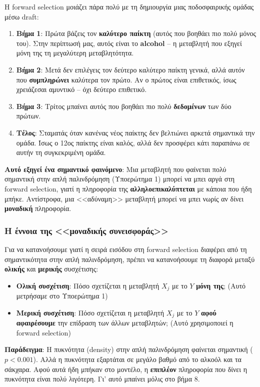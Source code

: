 \documentclass[12pt,a4paper]{article}
\begin{document}
\begin{examplebox}
Η forward selection μοιάζει πάρα πολύ με τη δημιουργία μιας ποδοσφαιρικής ομάδας μέσω draft:
\begin{enumerate}
    \item \textbf{Βήμα 1}: Πρώτα βάζεις τον \textbf{καλύτερο παίκτη} (αυτός που βοηθάει πιο πολύ μόνος του). Στην περίπτωσή μας, αυτός είναι το \textbf{alcohol} -- η μεταβλητή που εξηγεί μόνη της τη μεγαλύτερη μεταβλητότητα.
    \item \textbf{Βήμα 2}: Μετά δεν επιλέγεις τον δεύτερο καλύτερο παίκτη γενικά, αλλά αυτόν που \textbf{συμπληρώνει} καλύτερα τον πρώτο. Αν ο πρώτος είναι επιθετικός, ίσως χρειάζεσαι αμυντικό -- όχι δεύτερο επιθετικό.
    \item \textbf{Βήμα 3}: Τρίτος μπαίνει αυτός που βοηθάει πιο πολύ \textbf{δεδομένων} των δύο πρώτων.
    \item \textbf{Τέλος}: Σταματάς όταν κανένας νέος παίκτης δεν βελτιώνει αρκετά σημαντικά την ομάδα. Ίσως ο 12ος παίκτης είναι καλός, αλλά δεν προσφέρει κάτι παραπάνω σε αυτήν τη συγκεκριμένη ομάδα.
\end{enumerate}

\textbf{Αυτό εξηγεί ένα σημαντικό φαινόμενο}: Μια μεταβλητή που φαίνεται πολύ σημαντική στην απλή παλινδρόμηση (Υποερώτημα 1) μπορεί να μπει αργά στη forward selection, γιατί η πληροφορία της \textbf{αλληλοεπικαλύπτεται} με κάποια που ήδη μπήκε. Αντίστροφα, μια <<αδύναμη>> μεταβλητή μπορεί να μπει νωρίς αν δίνει \textbf{μοναδική} πληροφορία.
\end{examplebox}

\subsubsection{Η έννοια της <<μοναδικής συνεισφοράς>>}

\begin{theorybox}
Για να κατανοήσουμε γιατί η σειρά εισόδου στη forward selection διαφέρει από τη σημαντικότητα στην απλή παλινδρόμηση, πρέπει να κατανοήσουμε τη διαφορά μεταξύ \textbf{ολικής} και \textbf{μερικής} συσχέτισης:

\begin{itemize}
    \item \textbf{Ολική συσχέτιση}: Πόσο σχετίζεται η μεταβλητή $X_j$ με το $Y$ \textbf{μόνη της}; (Αυτό μετρήσαμε στο Υποερώτημα 1)
    \item \textbf{Μερική συσχέτιση}: Πόσο σχετίζεται η μεταβλητή $X_j$ με το $Y$ \textbf{αφού αφαιρέσουμε} την επίδραση των άλλων μεταβλητών; (Αυτό χρησιμοποιεί η forward selection)
\end{itemize}

\textbf{Παράδειγμα}: Η πυκνότητα (density) στην απλή παλινδρόμηση φαίνεται σημαντική ($p < 0.001$). Αλλά η πυκνότητα εξαρτάται σε μεγάλο βαθμό από το αλκοόλ και τα σάκχαρα. Αφού αυτά ήδη μπήκαν στο μοντέλο, η \textbf{επιπλέον} πληροφορία που δίνει η πυκνότητα είναι πολύ λιγότερη. Γι' αυτό μπαίνει μόλις στο βήμα 8.
\end{theorybox}
\end{document}
